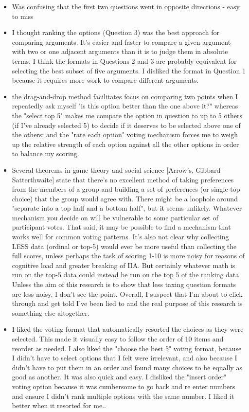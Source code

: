 \documentclass[10pt]{article}
\begin{document}
\begin{itemize}
\item Was confusing that the first two questions went in opposite directions - easy to miss
\item I thought ranking the options (Question 3) was the best approach for comparing arguments. It's easier and faster to compare a given argument with two or one adjacent arguments than it is to judge them in absolute terms.  I think the formats in Questions 2 and 3 are probably equivalent for selecting the best subset of five arguments. I disliked the format in Question 1 because it requires more work to compare different arguments. 
\item the drag-and-drop method facilitates focus on comparing two points when I repeatedly ask myself "is this option better than the one above it?" whereas the "select top 5" makes me compare the option in question to up to 5 others (if I've already selected 5) to decide if it deserves to be selected above one of the others; and the "rate each option" voting mechanism forces me to weigh up the relative strength of each option against all the other options in order to balance my scoring. 
\item Several theorems in game theory and social science [Arrow's, Gibbard–Satterthwaite] state that there's no excellent method of taking preferences from the members of a group and building a set of preferences (or single top choice) that the group would agree with. There might be a loophole around "separate into a top half and a bottom half", but it seems unlikely. Whatever mechanism you decide on will be vulnerable to some particular set of participant votes. That said, it may be possible to find a mechanism that works well for common voting patterns. It's also not clear why collecting LESS data (ordinal or top-5) would ever be more useful than collecting the full scores, unless perhaps the task of scoring 1-10 is more noisy for reasons of cognitive load and greater breaking of IIA. But certainly whatever math is run on the top-5 data could instead be run on the top 5 of the ranking data. Unless the aim of this research is to show that less taxing question formats are less noisy, I don't see the point. Overall, I suspect that I'm about to click through and get told I've been lied to and the real purpose of this research is something else altogether. 
\item I liked the voting format that automatically resorted the choices as they were selected. This made it visually easy to follow the order of 10 items and reorder as needed. I also liked the "choose the best 5" voting format, because I didn't have to select options that I felt were irrelevant, and also because I didn't have to put them in an order and found many choices to be equally as good as another. It was also quick and easy. I disliked the "insert order" voting option because it was cumbersome to go back and re enter numbers and ensure I didn't rank multiple options with the same number. I liked it better when it resorted for me..

\end{itemize}
\end{document}
